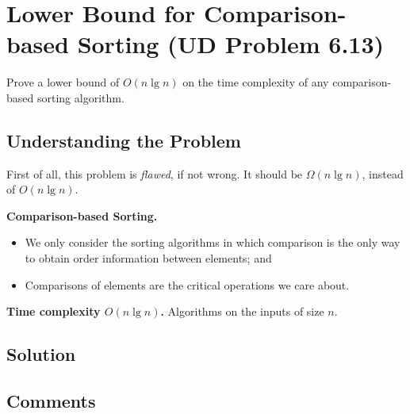 
\section{Lower Bound for Comparison-based Sorting (UD Problem 6.13)}

Prove a lower bound of $O(n \lg n)$ on the time complexity of any comparison-based sorting algorithm.

\subsection{Understanding the Problem}

First of all, this problem is \emph{flawed}, if not wrong.
It should be $\Omega(n \lg n)$, instead of $O(n \lg n)$.

{\bf Comparison-based Sorting.}

\begin{itemize}
  \item We only consider the sorting algorithms in which
    comparison is the only way to obtain order information between elements; and
  \item Comparisons of elements are the critical operations we care about.
\end{itemize}

{\bf Time complexity $O(n \lg n)$.} Algorithms on the inputs of size $n$.

\subsection{Solution}

\subsection{Comments}

